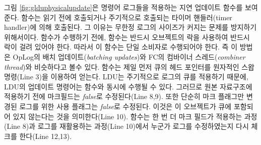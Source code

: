 그림 \ref{fig:glduphysicalupdate}은 명령어 로그들을 적용하는 지연 업데이트 함수를 보여준다. 
 함수는 읽기 전에 호출되거나 주기적으로 호출되는 타이머 핸들러(timer handler)에 의해
호출된다. 
그 이유는 무한정 로그의 사이즈가 커지는 문제를 방지하기 위해서이다.
 함수가 수행하기 전에,  함수는 반드시 오브젝트의 락을 사용하여
반드시 락이 걸려 있어야 한다.
따라서 이 함수는 단일 소비자로 수행되어야 한다. 즉 이 방법은 OpLog의 배치 
업데이트(\textit{batching updates})와 FC의 컴바이너 스레드(\textit{combiner thread})와 비슷하다고
볼수 있다.
 함수는 제일 먼저 큐의 헤드 포인터를 원자적인 스왑 명령(Line 3)을 이용하여 
얻는다.
LDU는 주기적으로 로그의 큐를 적용하기 때문에, LDU의 업데이트 명령어는  함수와 
동시에 수행될 수 있다. 
그러므로 원본 자료구조에 적용하기 전에 마크필드는 \textit{false}로 수정된다(Line 8,9).
또한 단순히 마크 플래그만 변경된 로그를 위한 사용 플래그는 \textit{false}로 수정된다. 
이것은 이 오브젝트가 큐에 포함되어 있지 않는다는 것을 의미한다(Line 10).
 함수는 한 번 더 마크 필드가 적용하는 과정(Line 8)과 로그를 재활용하는 과정(Line
10)에서 누군가 로그를 수정하였는지 다시 체크를 한다(Line 12,13).

